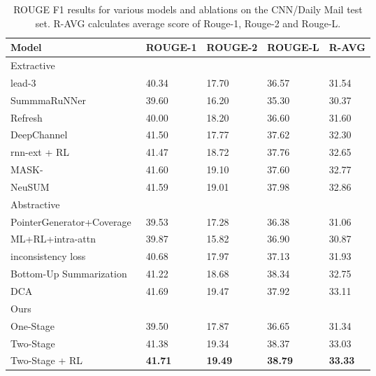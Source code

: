 \documentclass{article}
\begin{document}
\begin{table*}[tpb]  
\centering
\begin{tabular}{l|lll|l}
\hline
Model                 & ROUGE-1                     & ROUGE-2       &      ROUGE-L    &  R-AVG     \\ \hline
Extractive \\ \hline
lead-3~\cite{See2017}   & 40.34    &  17.70   &      36.57     &   31.54        \\
SummmaRuNNer~\cite{NallapatiZZ17}     & 39.60     &  16.20         &      35.30     &   30.37         \\ 
Refresh~\cite{Narayan2018}               & 40.00                       &  18.20         &      36.60     & 31.60            \\ 
DeepChannel~\cite{Shi2018}  & 41.50                       &  17.77         &      37.62   & 32.30        \\
rnn-ext + RL~\cite{chen2018fast}          & 41.47                       &  18.72         &      37.76   & 32.65            \\
MASK-~\cite{Chang2019}   & 41.60 & 19.10 & 37.60 & 32.77 \\
NeuSUM~\cite{DBLP:conf/acl/ZhaoZWYHZ18}              & 41.59                       &  19.01         &      37.98     & 32.86          \\
\hline
Abstractive \\ \hline
PointerGenerator+Coverage~\cite{See2017}      & 39.53                       & 17.28         &      36.38      & 31.06           \\
ML+RL+intra-attn~\cite{Paulus2018} & 39.87                  &  15.82        &      36.90      & 30.87           \\ 
inconsistency loss\cite{hsu2018unified}    & 40.68                       &  17.97        &      37.13      & 31.93      \\
Bottom-Up Summarization~\cite{gehrmann2018bottom} & 41.22                     &  18.68        &      38.34      & 32.75      \\
DCA~\cite{Celikyilmaz2018}                   & 41.69                       &  19.47        &      37.92      & 33.11         \\ \hline
Ours \\ \hline
One-Stage           &39.50        & 17.87          & 36.65  & 31.34  \\   
Two-Stage         & 41.38  & 19.34 & 38.37       & 33.03 \\
Two-Stage + RL               & \textbf{41.71} & \textbf{19.49} & \textbf{38.79}               & \textbf{33.33}                      \\ \hline
\end{tabular}
\caption{ROUGE F1 results for various models and ablations on the CNN/Daily Mail test set. R-AVG calculates average score of Rouge-1, Rouge-2 and Rouge-L.\label{r1}}
\end{table*}
\end{document}
